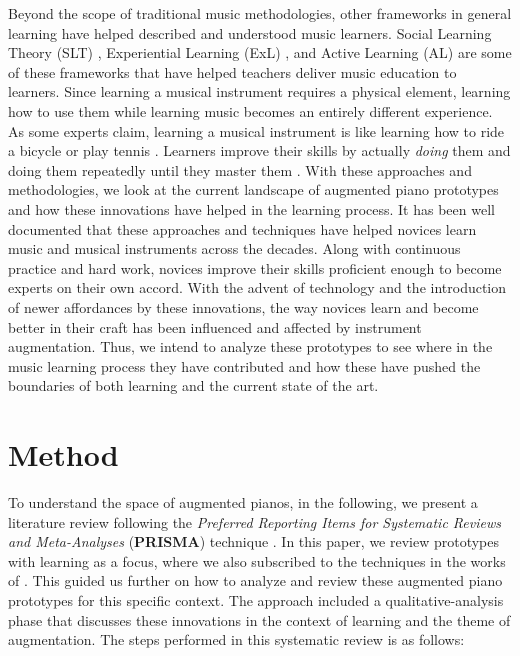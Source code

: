 \documentclass[sigconf, screen, review]{acmart}
\let\xtodo\todo
\renewcommand{\todo}[1]{\xtodo[inline]{#1}}
\newcommand{\todok}[1]{\xtodo[inline,color=green!50]{M and K: #1}}
\begin{document}
Beyond the scope of traditional music methodologies, other frameworks in general learning have helped described and understood music learners. Social Learning Theory (SLT) \cite{waldron2009exploring, gordon2011roots}, Experiential Learning (ExL) \cite{webster2011construction, russell2013mission}, and Active Learning (AL) \cite{scott2011contemplating, michael2003active} are some of these frameworks that have helped teachers deliver music education to learners. Since learning a musical instrument requires a physical element, learning how to use them while learning music becomes an entirely different experience. As some experts claim, learning a musical instrument is like learning how to ride a bicycle or play tennis \cite{}. Learners improve their skills by actually \textit{doing} them and doing them repeatedly until they master them \cite{stryker1997content}. With these approaches and methodologies, we look at the current landscape of augmented piano prototypes and how these innovations have helped in the learning process. It has been well documented that these approaches and techniques have helped novices learn music and musical instruments across the decades. Along with continuous practice and hard work, novices improve their skills proficient enough to become experts on their own accord. With the advent of technology and the introduction of newer affordances by these innovations, the way novices learn and become better in their craft has been influenced and affected by instrument augmentation. Thus, we intend to analyze these prototypes to see where in the music learning process they have contributed and how these have pushed the boundaries of both learning and the current state of the art. 

\todok{Please give feedback. Thank you!}
\section{Method}
To understand the space of augmented pianos, in the following, we present a literature review following the \textit{Preferred Reporting Items for Systematic Reviews and Meta-Analyses} (\textbf{PRISMA}) technique \cite{moher2009preferred}. In this paper, we review prototypes with learning as a focus, where we also subscribed to the techniques in the works of \cite{santos2013augmented, schneegass2016mobile, kljun2015transference, blattgerste2019augmented, mcpherson2015buttons, delgado2011state}. This guided us further on how to analyze and review these augmented piano prototypes for this specific context. The approach included a qualitative-analysis phase that discusses these innovations in the context of learning and the theme of augmentation. The steps performed in this systematic review is as follows: 
\end{document}
